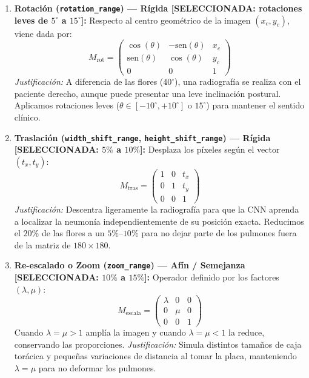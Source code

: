 \documentclass[11pt, a4paper]{article}
\numberwithin{equation}{section}
\begin{document}
\begin{enumerate}
    \item \textbf{Rotación (\texttt{rotation\_range}) --- Rígida [SELECCIONADA: rotaciones leves de $5^\circ$ a $15^\circ$]:}
    Respecto al centro geométrico de la imagen $(x_c, y_c)$, viene dada por:
    \begin{equation}
        M_{\text{rot}} = \begin{pmatrix} \cos(\theta) & -\text{sen}(\theta) & x_c \\ \text{sen}(\theta) & \cos(\theta) & y_c \\ 0 & 0 & 1 \end{pmatrix}
    \end{equation}
    \textit{Justificación:} A diferencia de las flores ($40^\circ$), una radiografía se realiza con el paciente derecho, aunque puede presentar una leve inclinación postural. Aplicamos rotaciones leves ($\theta \in [-10^\circ, +10^\circ]$ o $15^\circ$) para mantener el sentido clínico.

    \item \textbf{Traslación (\texttt{width\_shift\_range}, \texttt{height\_shift\_range}) --- Rígida [SELECCIONADA: $5\%$ a $10\%$]:}
    Desplaza los píxeles según el vector $(t_x, t_y)$:
    \begin{equation}
        M_{\text{tras}} = \begin{pmatrix} 1 & 0 & t_x \\ 0 & 1 & t_y \\ 0 & 0 & 1 \end{pmatrix}
    \end{equation}
    \textit{Justificación:} Descentra ligeramente la radiografía para que la CNN aprenda a localizar la neumonía independientemente de su posición exacta. Reducimos el $20\%$ de las flores a un $5\%\text{--}10\%$ para no dejar parte de los pulmones fuera de la matriz de $180 \times 180$.

    \item \textbf{Re-escalado o Zoom (\texttt{zoom\_range}) --- Afín / Semejanza [SELECCIONADA: $10\%$ a $15\%$]:}
    Operador definido por los factores $(\lambda, \mu)$:
    \begin{equation}
        M_{\text{escala}} = \begin{pmatrix} \lambda & 0 & 0 \\ 0 & \mu & 0 \\ 0 & 0 & 1 \end{pmatrix}
    \end{equation}
    Cuando $\lambda = \mu > 1$ amplía la imagen y cuando $\lambda = \mu < 1$ la reduce, conservando las proporciones.
    \textit{Justificación:} Simula distintos tamaños de caja torácica y pequeñas variaciones de distancia al tomar la placa, manteniendo $\lambda = \mu$ para no deformar los pulmones.


\end{enumerate}
\end{document}
